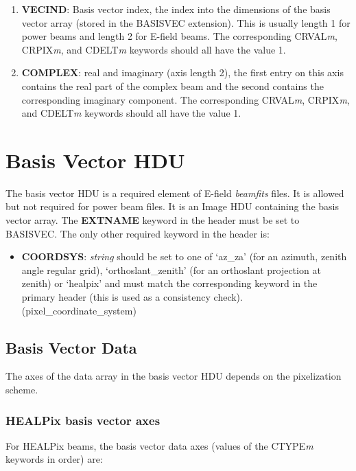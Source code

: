 \documentclass[11pt, oneside]{article}   	%
\begin{document}
\begin{enumerate}
\item{\textbf{VECIND}: Basis vector index, the index into the dimensions of the basis vector array (stored in the BASISVEC extension). This is usually length 1 for power beams and length 2 for E-field beams. The corresponding CRVAL\textit{m}, CRPIX\textit{m}, and CDELT\textit{m} keywords should all have the value 1.}
\item{\textbf{COMPLEX}: real and imaginary (axis length 2), the first entry on this axis contains the real part of the complex beam and the second contains the corresponding imaginary component. The corresponding CRVAL\textit{m}, CRPIX\textit{m}, and CDELT\textit{m} keywords should all have the value 1.}
\end{enumerate}

\section{Basis Vector HDU}
The basis vector HDU is a required element of E-field \textit{beamfits} files. It is allowed but not required for power beam files. It is an Image HDU containing the basis vector array.
The \textbf{EXTNAME} keyword in the header must be set to BASISVEC. The only other required keyword in the header is:

\begin{itemize}
\item{\textbf{COORDSYS}: \textit{string} should be set to one of `az\_za' (for an azimuth, zenith angle regular grid), `orthoslant\_zenith' (for an orthoslant projection at zenith) or `healpix'  and must match the corresponding keyword in the primary header (this is used as a consistency check). (pixel\_coordinate\_system)}
\end{itemize}

\subsection{Basis Vector Data}
The axes of the data array in the basis vector HDU depends on the pixelization scheme.

\subsubsection{HEALPix basis vector axes}
For HEALPix beams, the basis vector data axes (values of the CTYPE\textit{m} keywords in order) are: 
\end{document}
